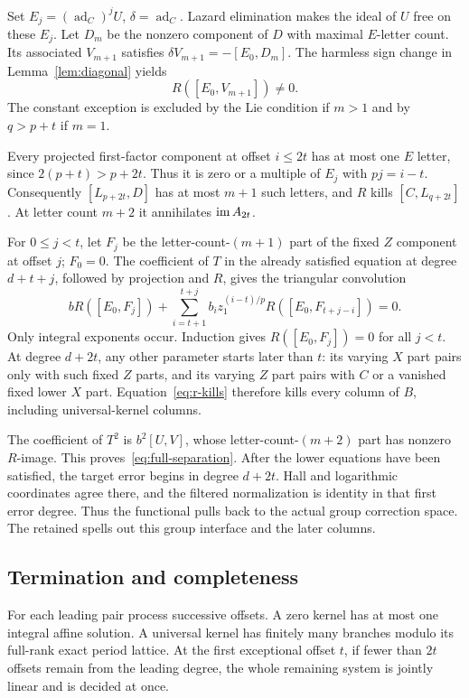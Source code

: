 Set $E_j=(\operatorname{ad}_C)^jU$, $\delta=\operatorname{ad}_C$.
Lazard elimination makes the ideal of $U$ free on these $E_j$.
Let $D_m$ be the nonzero component of $D$ with maximal $E$-letter
count. Its associated $V_{m+1}$ satisfies
$\delta V_{m+1}=-[E_0,D_m]$. The harmless sign change in
Lemma~\ref{lem:diagonal} yields
\[
 R([E_0,V_{m+1}])\ne0.
\]
The constant exception is excluded by the Lie condition if $m>1$
and by $q>p+t$ if $m=1$.

Every projected first-factor component at offset $i\le2t$ has at
most one $E$ letter, since $2(p+t)>p+2t$. Thus it is zero or a
multiple of $E_j$ with $pj=i-t$. Consequently
$[L_{p+2t},D]$ has at most $m+1$ such letters, and $R$ kills
$[C,L_{q+2t}]$. At letter count $m+2$ it annihilates $\operatorname{im} A_{2t}$.

For $0\le j<t$, let $F_j$ be the letter-count-$(m+1)$ part of the
fixed $Z$ component at offset $j$; $F_0=0$. The coefficient of $T$
in the already satisfied equation at degree $d+t+j$, followed by
projection and $R$, gives the triangular convolution
\[
 bR([E_0,F_j])+\sum_{i=t+1}^{t+j}
 b_i z_1^{(i-t)/p}R([E_0,F_{t+j-i}])=0.
\]
Only integral exponents occur. Induction gives $R([E_0,F_j])=0$
for all $j<t$. At degree $d+2t$, any other parameter starts later
than $t$: its varying $X$ part pairs only with such fixed $Z$ parts,
and its varying $Z$ part pairs with $C$ or a vanished fixed lower
$X$ part. Equation~\eqref{eq:r-kills} therefore kills every column
of $B$, including universal-kernel columns.

The coefficient of $T^2$ is $b^2[U,V]$, whose letter-count-$(m+2)$
part has nonzero $R$-image. This proves~\eqref{eq:full-separation}.
After the lower equations have been satisfied, the target error begins
in degree $d+2t$. Hall and logarithmic coordinates agree there, and
the filtered normalization is identity in that first error degree.
Thus the functional pulls back to the actual group correction space.
The retained 
spells out this group interface and the later columns.

\subsection{Termination and completeness}
For each leading pair process successive offsets. A zero kernel has
at most one integral affine solution. A universal kernel has finitely
many branches modulo its full-rank exact period lattice. At the first
exceptional offset $t$, if fewer than $2t$ offsets remain from the
leading degree, the whole remaining system is jointly linear and is
decided at once.

